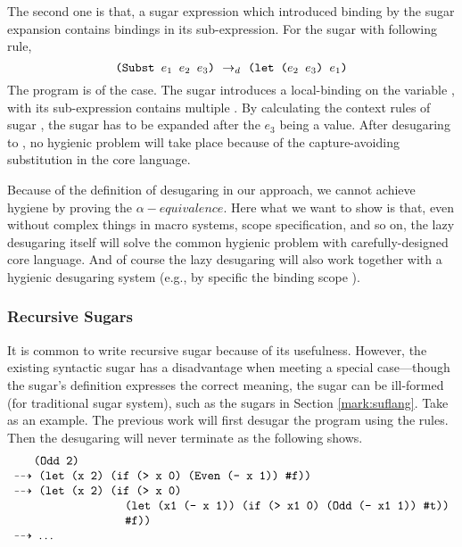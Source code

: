 The second one is that, a sugar expression which introduced binding by the sugar expansion contains bindings in its sub-expression. For the sugar  with following rule,
\[
\texttt{(Subst $e_1$ $e_2$ $e_3$)} ~\rightarrow_d~ \texttt{(let ($e_2$ $e_3$) $e_1$)}
\]
The program  is of the case. The sugar introduces a local-binding on the variable , with its sub-expression contains multiple . By calculating the context rules of sugar , the sugar has to be expanded after the $e_3$ being a value. After desugaring to ,  no hygienic problem will take place because of the capture-avoiding substitution in the core language.

Because of the definition of desugaring in our approach, we cannot achieve hygiene by proving the $\alpha-equivalence$.
Here what we want to show is that, even without complex things in macro systems, scope specification, and so on, the lazy desugaring itself will solve the common hygienic problem with carefully-designed core language. And of course the lazy desugaring will also work together with a hygienic desugaring system (e.g., by specific the binding scope \cite{10.5555/1792878.1792884}).

\subsubsection{Recursive Sugars}
\label{sec:recursiveSugar}

It is common to write recursive sugar because of its usefulness. However, the existing syntactic sugar has a disadvantage when meeting a special case---though the sugar's definition expresses the correct meaning, the sugar can be ill-formed (for traditional sugar system), such as the  sugars in Section \ref{mark:suflang}. Take  as an example. The previous work will first desugar the program using the rules. Then the desugaring will never terminate as the following shows.
\[
	\begin{array}{l}
		\quad\;\ \Code{(Odd 2)}\\
		\DeStep{\Code{ (let (x 2) (if (> x 0) (Even (- x 1)) \false))}}\\
		\DeStep{\Code{ (let (x 2) (if (> x 0)}}\\
		\qquad\qquad\qquad\qquad\quad \Code{(let (x1 (- x 1)) (if (> x1 0) (Odd (- x1 1)) \#t))}\\
		\qquad\qquad\qquad\qquad\quad \Code{\false))}\\
		\DeStep{\Code{ $\ldots$}}
	\end{array}
\]



